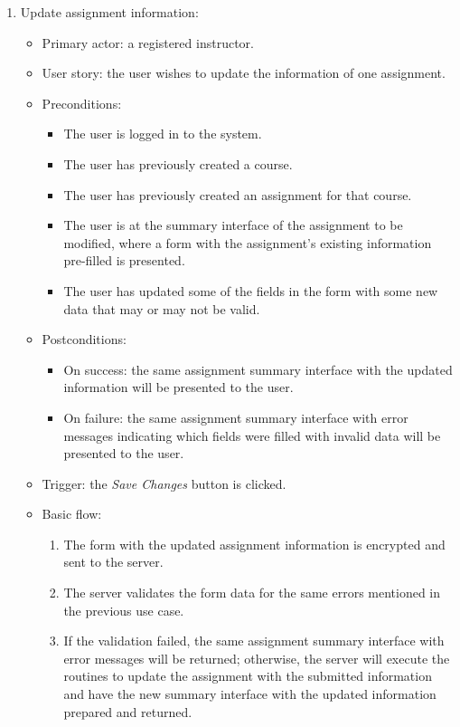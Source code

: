 \begin{enumerate}
\item Update assignment information:
\begin{itemize}
    \item Primary actor: a registered instructor.
    \item User story: the user wishes to update the information of one
        assignment.
    \item Preconditions:
        \begin{itemize}
            \item The user is logged in to the system.
            \item The user has previously created a course.
            \item The user has previously created an assignment for that course.
            \item The user is at the summary interface of the assignment to be
                modified, where a form with the assignment's existing
                information pre-filled is presented.
            \item The user has updated some of the fields in the form with some
                new data that may or may not be valid.
        \end{itemize}
    \item Postconditions:
        \begin{itemize}
            \item On success: the same assignment summary interface with the updated
                information will be presented to the user.
            \item On failure: the same assignment summary interface with error
                messages indicating which fields were filled with invalid data will
                be presented to the user.
        \end{itemize}
    \item Trigger: the \emph{Save Changes} button is clicked.
    \item Basic flow:
        \begin{enumerate}
            \item The form with the updated assignment information is encrypted
                and sent to the server.
            \item The server validates the form data for the same errors
                mentioned in the previous use case.
            \item If the validation failed, the same assignment summary interface
                with error messages will be returned; otherwise, the server will
                execute the routines to update the assignment with the submitted
                information and have the new summary interface with the updated
                information prepared and returned.
        \end{enumerate}
\end{itemize}


\end{enumerate}
